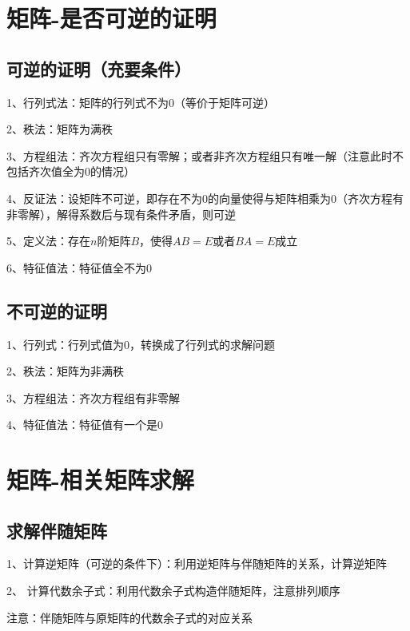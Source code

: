 \section{矩阵-是否可逆的证明}



\subsection{可逆的证明（充要条件）}

1、行列式法：矩阵的行列式不为0（等价于矩阵可逆）

2、秩法：矩阵为满秩

3、方程组法：齐次方程组只有零解；或者非齐次方程组只有唯一解（注意此时不包括齐次值全为0的情况）

4、反证法：设矩阵不可逆，即存在不为0的向量使得与矩阵相乘为0（齐次方程有非零解），解得系数后与现有条件矛盾，则可逆

5、定义法：存在$n$阶矩阵$B$，使得$AB=E$或者$BA=E$成立

6、特征值法：特征值全不为0



\subsection{不可逆的证明}

1、行列式：行列式值为0，转换成了行列式的求解问题

2、秩法：矩阵为非满秩

3、方程组法：齐次方程组有非零解

4、特征值法：特征值有一个是0

\section{矩阵-相关矩阵求解}



\subsection{求解伴随矩阵}

1、计算逆矩阵（可逆的条件下）：利用逆矩阵与伴随矩阵的关系，计算逆矩阵

2、 计算代数余子式：利用代数余子式构造伴随矩阵，注意排列顺序

注意：伴随矩阵与原矩阵的代数余子式的对应关系



